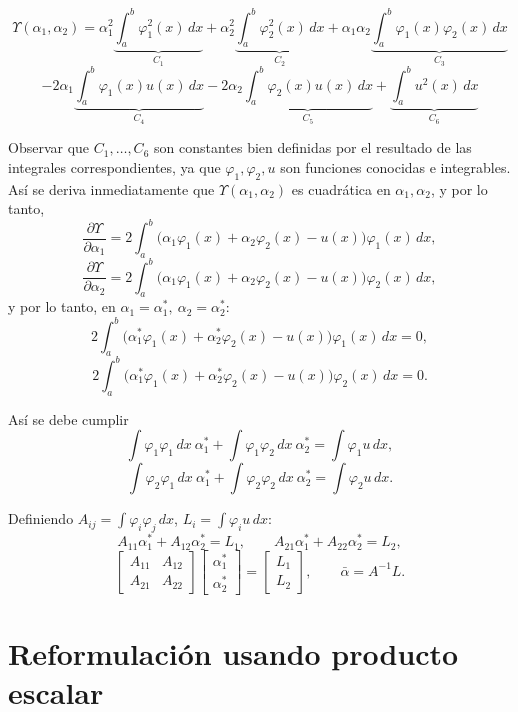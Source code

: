 \documentclass[11pt]{article}
\begin{document}
\[
\Upsilon(\alpha_1, \alpha_2) =
\alpha_1^2 \underbrace{\int_a^b \varphi_1^2(x)\, dx}_{C_1}
+ \alpha_2^2 \underbrace{\int_a^b \varphi_2^2(x)\, dx}_{C_2}
+ \alpha_1 \alpha_2 \underbrace{\int_a^b \varphi_1(x)\varphi_2(x)\, dx}_{C_3}
\]
\[
- 2\alpha_1 \underbrace{\int_a^b \varphi_1(x) u(x)\, dx}_{C_4}
- 2\alpha_2 \underbrace{\int_a^b \varphi_2(x) u(x)\, dx}_{C_5}
+ \underbrace{\int_a^b u^2(x)\, dx}_{C_6}
\]

Observar que $C_1, \ldots, C_6$ son constantes bien definidas por el resultado de las integrales correspondientes, ya que $\varphi_1, \varphi_2, u$ son funciones conocidas e integrables. Así se deriva inmediatamente que $\Upsilon(\alpha_1, \alpha_2)$ es cuadrática en $\alpha_1, \alpha_2$, y por lo tanto,
\[
\frac{\partial \Upsilon}{\partial \alpha_1} = 2\int_a^b \big(\alpha_1 \varphi_1(x) + \alpha_2 \varphi_2(x) - u(x)\big)\varphi_1(x)\, dx,
\]
\[
\frac{\partial \Upsilon}{\partial \alpha_2} = 2\int_a^b \big(\alpha_1 \varphi_1(x) + \alpha_2 \varphi_2(x) - u(x)\big)\varphi_2(x)\, dx,
\]
y por lo tanto, en $\alpha_1 = \alpha_1^*,\ \alpha_2 = \alpha_2^*$:
\[
2\int_a^b \big(\alpha_1^* \varphi_1(x) + \alpha_2^* \varphi_2(x) - u(x)\big)\varphi_1(x)\, dx = 0,
\]
\[
2\int_a^b \big(\alpha_1^* \varphi_1(x) + \alpha_2^* \varphi_2(x) - u(x)\big)\varphi_2(x)\, dx = 0.
\]

Así se debe cumplir
\[
\int \varphi_1 \varphi_1\, dx\ \alpha_1^* + \int \varphi_1 \varphi_2\, dx\ \alpha_2^* = \int \varphi_1 u\, dx,
\]
\[
\int \varphi_2 \varphi_1\, dx\ \alpha_1^* + \int \varphi_2 \varphi_2\, dx\ \alpha_2^* = \int \varphi_2 u\, dx.
\]

Definiendo $A_{ij} = \int \varphi_i \varphi_j\, dx$, $L_i = \int \varphi_i u\, dx$:
\[
A_{11}\alpha_1^* + A_{12}\alpha_2^* = L_1, \qquad A_{21}\alpha_1^* + A_{22}\alpha_2^* = L_2,
\]
\[
\begin{bmatrix} A_{11} & A_{12} \\ A_{21} & A_{22} \end{bmatrix}
\begin{bmatrix} \alpha_1^* \\ \alpha_2^* \end{bmatrix}
=
\begin{bmatrix} L_1 \\ L_2 \end{bmatrix},
\qquad \bar{\alpha} = A^{-1} L.
\]

\section{Reformulación usando producto escalar}
\end{document}

